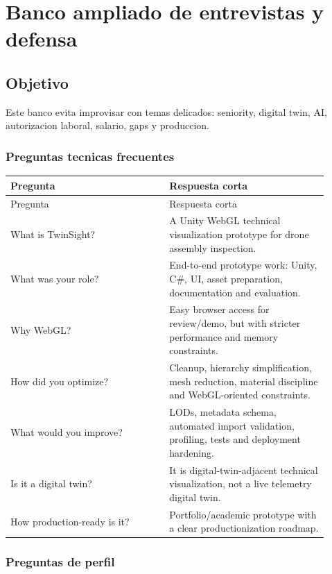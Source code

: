\chapter{Banco ampliado de entrevistas y defensa}

\section{Objetivo}


Este banco evita improvisar con temas delicados: seniority, digital twin, AI, autorizacion laboral, salario, gaps y produccion.


\subsection{Preguntas tecnicas frecuentes}


\begin{center}
\scriptsize
\begin{longtable}{>{\raggedright\arraybackslash}p{0.455\linewidth} >{\raggedright\arraybackslash}p{0.455\linewidth}}
\toprule
Pregunta & Respuesta corta \\
\midrule
\endfirsthead
\toprule
Pregunta & Respuesta corta \\
\midrule
\endhead
What is TwinSight? & A Unity WebGL technical visualization prototype for drone assembly inspection. \\
What was your role? & End-to-end prototype work: Unity, C\#, UI, asset preparation, documentation and evaluation. \\
Why WebGL? & Easy browser access for review/demo, but with stricter performance and memory constraints. \\
How did you optimize? & Cleanup, hierarchy simplification, mesh reduction, material discipline and WebGL-oriented constraints. \\
What would you improve? & LODs, metadata schema, automated import validation, profiling, tests and deployment hardening. \\
Is it a digital twin? & It is digital-twin-adjacent technical visualization, not a live telemetry digital twin. \\
How production-ready is it? & Portfolio/academic prototype with a clear productionization roadmap. \\
\bottomrule
\end{longtable}
\end{center}


\subsection{Preguntas de perfil}


